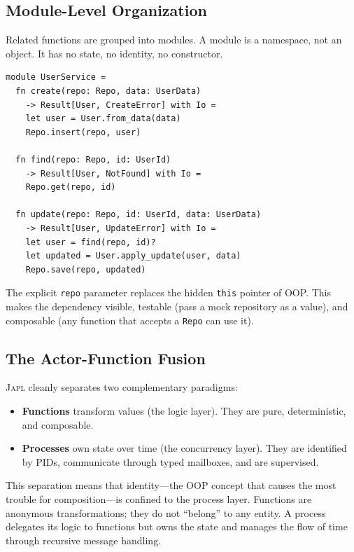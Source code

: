 \documentclass[11pt,a4paper]{article}
\newcommand{\japl}{\textsc{Japl}}
\begin{document}
\subsection{Module-Level Organization}

Related functions are grouped into modules. A module is a namespace, not an object. It has no state, no identity, no constructor.

\begin{lstlisting}
module UserService =
  fn create(repo: Repo, data: UserData)
    -> Result[User, CreateError] with Io =
    let user = User.from_data(data)
    Repo.insert(repo, user)

  fn find(repo: Repo, id: UserId)
    -> Result[User, NotFound] with Io =
    Repo.get(repo, id)

  fn update(repo: Repo, id: UserId, data: UserData)
    -> Result[User, UpdateError] with Io =
    let user = find(repo, id)?
    let updated = User.apply_update(user, data)
    Repo.save(repo, updated)
\end{lstlisting}

The explicit \texttt{repo} parameter replaces the hidden \texttt{this} pointer of OOP. This makes the dependency visible, testable (pass a mock repository as a value), and composable (any function that accepts a \texttt{Repo} can use it).

\subsection{The Actor-Function Fusion}

\japl{} cleanly separates two complementary paradigms:

\begin{itemize}
  \item \textbf{Functions} transform values (the logic layer). They are pure, deterministic, and composable.
  \item \textbf{Processes} own state over time (the concurrency layer). They are identified by PIDs, communicate through typed mailboxes, and are supervised.
\end{itemize}

This separation means that identity---the OOP concept that causes the most trouble for composition---is confined to the process layer. Functions are anonymous transformations; they do not ``belong'' to any entity. A process delegates its logic to functions but owns the state and manages the flow of time through recursive message handling.
\end{document}
